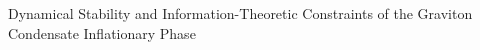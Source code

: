 \documentclass[]{article}
\begin{document}
Dynamical Stability and Information-Theoretic Constraints of the Graviton Condensate Inflationary Phase
\end{document}
